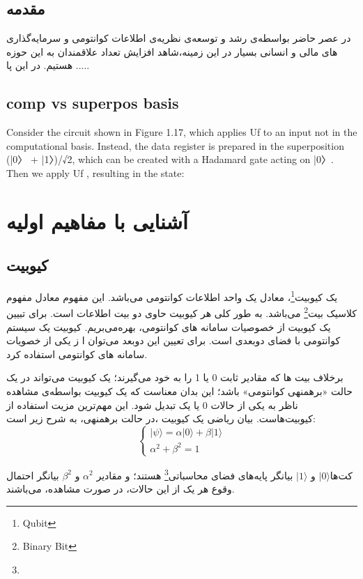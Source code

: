 \documentclass{book}
\begin{document}
\tableofcontents
\section{مقدمه}	
در عصر حاضر بواسطه‌ی رشد و توسعه‌ی نظریه‌ی اطلاعات کوانتومی و سرمایه‌گذاری های مالی و انسانی بسیار در این زمینه،‌شاهد افزایش تعداد علاقمندان به این حوزه هستیم. در این پا .....

\section{comp vs superpos basis}
Consider the circuit shown in Figure 1.17, which applies Uf to an input not in the
computational basis. Instead, the data register is prepared in the superposition (|0〉 +
|1〉)/√2, which can be created with a Hadamard gate acting on |0〉. Then we apply Uf ,
resulting in the state:



\chapter{آشنایی با مفاهیم اولیه}
\section{کیوبیت}

یک کیوبیت\footnote{Qubit}، معادل یک واحد اطلاعات کوانتومی می‌باشد. این مفهوم معادل مفهوم کلاسیک بیت\footnote{Binary Bit} می‌باشد. به طور کلی هر کیوبیت حاوی دو بیت اطلاعات است. برای تبیین یک کیوبیت از خصوصیات سامانه های کوانتومی، بهره‌می‌بریم. کیوبیت یک سیستم کوانتومی با فضای دوبعدی است. برای تعیین این دوبعد می‌توان ا ز یکی از خصویات سامانه های کوانتومی استفاده کرد. 

برخلاف بیت ها که مقادیر ثابت 0 یا 1 را به خود می‌گیرند؛ یک کیوبیت می‌تواند در یک حالت «برهمنهی کوانتومی» باشد؛ این بدان معناست که یک کیوبیت بواسطه‌ی مشاهده ناظر به یکی از حالات 0 یا یک تبدیل شود. این مهم‌ترین مزیت استفاده از کیوبیت‌هاست. بیان ریاضی یک کیوبیت ،در حالت برهمنهی، به شرح زیر است:
\vspace{2cm}
$$
\left\{
\begin{array}{ll}
	  \vert \psi \rangle = \alpha\vert 0 \rangle + \beta\vert 1 \rangle \\
	  \alpha^2 + \beta^2 = 1
\end{array}
\right.
$$
\vspace{2cm}

\newpage
کت‌ها$\vert 0 \rangle$ و $\vert 1 \rangle$ بیانگر پایه‌های فضای 
محاسباتی\footnote{} هستند؛ و مقادیر $\alpha^2$ و $\beta^2$ بیانگر احتمال وقوع هر یک از این حالات، در صورت مشاهده، می‌باشند.
\end{document}
